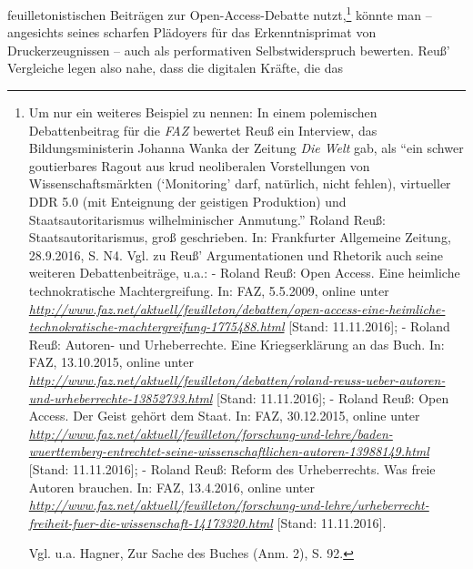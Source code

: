 \documentclass[a4paper,
fontsize=11pt,
oneside,
numbers=noperiodatend,
parskip=half-,
bibliography=totoc,
final
]{scrartcl}
\begin{document}
feuilletonistischen Beiträgen zur Open-Access-Debatte nutzt,\footnote{Um
  nur ein weiteres Beispiel zu nennen: In einem polemischen
  Debattenbeitrag für die \emph{FAZ} bewertet Reuß ein Interview, das
  Bildungsministerin Johanna Wanka der Zeitung \emph{Die Welt} gab, als
  \enquote{ein schwer goutierbares Ragout aus krud neoliberalen
  Vorstellungen von Wissenschaftsmärkten (\enquote{Monitoring} darf,
  natürlich, nicht fehlen), virtueller DDR 5.0 (mit Enteignung der
  geistigen Produktion) und Staatsautoritarismus wilhelminischer
  Anmutung.} Roland Reuß: Staatsautoritarismus, groß geschrieben. In:
  Frankfurter Allgemeine Zeitung, 28.9.2016, S. N4. Vgl. zu Reuß'
  Argumentationen und Rhetorik auch seine weiteren Debattenbeiträge,
  u.a.: - Roland Reuß: Open Access. Eine heimliche technokratische
  Machtergreifung. In: FAZ, 5.5.2009, online unter
  \href{http://www.faz.net/aktuell/feuilleton/debatten/open-access-eine-heimliche-technokratische-machtergreifung-1775488.html}{\emph{http://www.faz.net/aktuell/feuilleton/debatten/open-access-eine-heimliche-technokratische-machtergreifung-1775488.html}}
  {[}Stand: 11.11.2016{]}; - Roland Reuß: Autoren- und Urheberrechte.
  Eine Kriegserklärung an das Buch. In: FAZ, 13.10.2015, online unter
  \href{http://www.faz.net/aktuell/feuilleton/debatten/roland-reuss-ueber-autoren-und-urheberrechte-13852733.html}{\emph{http://www.faz.net/aktuell/feuilleton/debatten/roland-reuss-ueber-autoren-und-urheberrechte-13852733.html}}
  {[}Stand: 11.11.2016{]}; - Roland Reuß: Open Access. Der Geist gehört
  dem Staat. In: FAZ, 30.12.2015, online unter
  \href{http://www.faz.net/aktuell/feuilleton/forschung-und-lehre/baden-wuerttemberg-entrechtet-seine-wissenschaftlichen-autoren-13988149.html}{\emph{http://www.faz.net/aktuell/feuilleton/forschung-und-lehre/baden-wuerttemberg-entrechtet-seine-wissenschaftlichen-autoren-13988149.html}}
  {[}Stand: 11.11.2016{]}; - Roland Reuß: Reform des Urheberrechts. Was
  freie Autoren brauchen. In: FAZ, 13.4.2016, online unter
  \href{http://www.faz.net/aktuell/feuilleton/forschung-und-lehre/urheberrecht-freiheit-fuer-die-wissenschaft-14173320.html}{\emph{http://www.faz.net/aktuell/feuilleton/forschung-und-lehre/urheberrecht-freiheit-fuer-die-wissenschaft-14173320.html}}
  {[}Stand: 11.11.2016{]}.

  Vgl. u.a. Hagner, Zur Sache des Buches (Anm. 2), S. 92.} könnte man --
angesichts seines scharfen Plädoyers für das Erkenntnisprimat von
Druck\-er\-zeug\-nissen -- auch als performativen Selbstwiderspruch bewerten.
Reuß' Vergleiche legen also nahe, dass die digitalen Kräfte, die das
\end{document}

